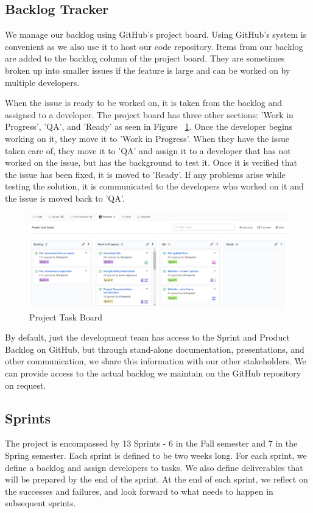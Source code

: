\subsection{Backlog Tracker}

We manage our backlog using GitHub's project board. Using GitHub's system is 
convenient as we also use it to host our code repository. Items from our backlog 
are added to the backlog column of the project board. They are sometimes broken 
up into smaller issues if the feature is large and can be worked on by multiple 
developers.

When the issue is ready to be worked on, it is taken from the backlog and 
assigned to a developer. The project board has three other sections: 
'Work in Progress', 'QA', and 'Ready' as seen in Figure 
~\ref{fig:ProjectTaskBoard}. Once the developer begins working on it, 
they move it to 'Work in Progress'. When they have the issue taken care of, they
move it to 'QA' and assign it to a developer that has not worked on the issue, 
but has the background to test it. Once it is verified that the issue has been 
fixed, it is moved to 'Ready'. If any problems arise while testing the solution,
it is communicated to the developers who worked on it and the issue is moved 
back to 'QA'.

\begin{figure}[H]
    \centering
    \includegraphics[width=\textwidth]{ProjectTaskBoard.png}
    \caption{Project Task Board}
    \label{fig:ProjectTaskBoard}
\end{figure}

By default, just the development team has access to the Sprint and Product 
Backlog on GitHub, but through stand-alone documentation, presentations, and 
other communication, we share this information with our other stakeholders. 
We can provide access to the actual backlog we maintain on the GitHub repository
on request.

\subsection{Sprints}
The project is encompassed by 13 Sprints - 6 in the Fall semester and 7 in the 
Spring semester. Each sprint is defined to be two weeks long. 
For each sprint, we define a backlog and assign developers to tasks. We also 
define deliverables that will be prepared by the end of the sprint. At the end 
of each sprint, we reflect on the successes and failures, and look forward to 
what needs to happen in subsequent sprints.


